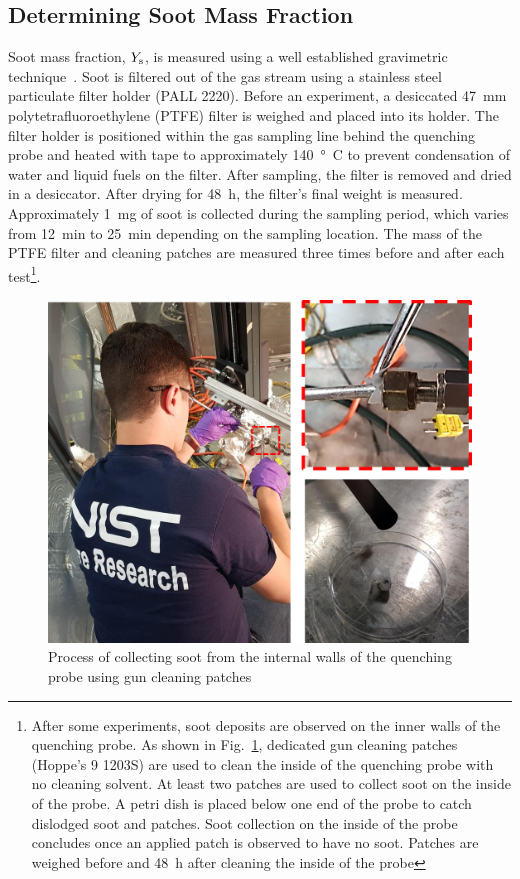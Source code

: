 \documentclass[12pt]{article}
\begin{document}
\subsection{Determining Soot Mass Fraction}
\label{ssec:Soot_Setup}

Soot mass fraction, $Y_{\rm s}$, is measured using a well established gravimetric technique~\cite{Choi1995}. Soot is filtered out of the gas stream using a stainless steel particulate filter holder (PALL 2220). Before an experiment, a desiccated \SI{47}{mm} polytetrafluoroethylene (PTFE) filter is weighed and placed into its holder. The filter holder is positioned within the gas sampling line behind the quenching probe and heated with tape to approximately \SI{140}{\degree C} to prevent condensation of water and liquid fuels on the filter. After sampling, the filter is removed and dried in a desiccator. After drying for 48~h, the filter’s final weight is measured. Approximately \SI{1}{mg} of soot is collected during the sampling period, which varies from 12~min to 25~min depending on the sampling location. The mass of the PTFE filter and cleaning patches are measured three times before and after each test\footnote{After some experiments, soot deposits are observed on the inner walls of the quenching probe. As shown in Fig.~\ref{fig:Soot_Probe_Setup}, dedicated gun cleaning patches (Hoppe's 9 1203S) are used to clean the inside of the quenching probe with no cleaning solvent. At least two patches are used to collect soot on the inside of the probe. A petri dish is placed below one end of the probe to catch dislodged soot and patches. Soot collection on the inside of the probe concludes once an applied patch is observed to have no soot. Patches are weighed before and 48~h after cleaning the inside of the probe}.

\begin{figure}[ht!]
	\centering
\includegraphics[width=15.0cm,keepaspectratio]{Soot_Probe.png}
	\caption[Process for cleaning soot probe]{Process of collecting soot from the internal walls of the quenching probe using gun cleaning patches}
	\label{fig:Soot_Probe_Setup}
\end{figure}
\end{document}

